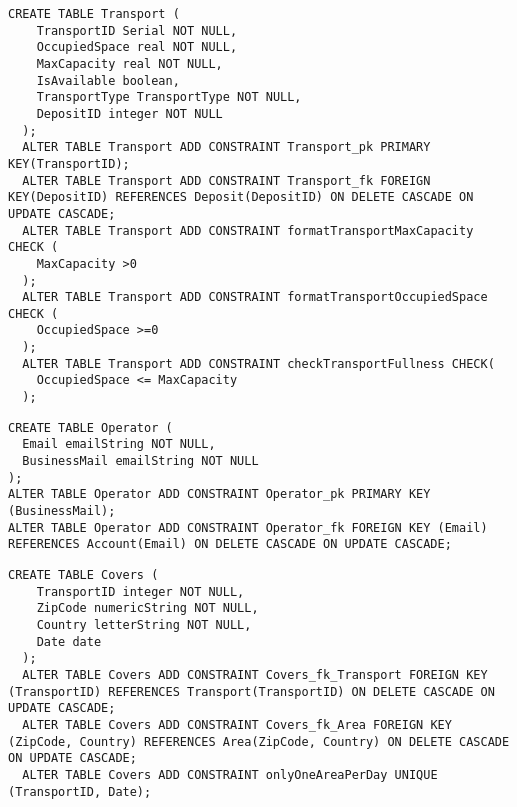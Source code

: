 \newpage
\begin{lstlisting}[caption={Creazione della tabella \textbf{Transport}}]
  CREATE TABLE Transport (
    TransportID Serial NOT NULL,
    OccupiedSpace real NOT NULL,
    MaxCapacity real NOT NULL,
    IsAvailable boolean, 
    TransportType TransportType NOT NULL,
    DepositID integer NOT NULL
  );
  ALTER TABLE Transport ADD CONSTRAINT Transport_pk PRIMARY KEY(TransportID);
  ALTER TABLE Transport ADD CONSTRAINT Transport_fk FOREIGN KEY(DepositID) REFERENCES Deposit(DepositID) ON DELETE CASCADE ON UPDATE CASCADE; 
  ALTER TABLE Transport ADD CONSTRAINT formatTransportMaxCapacity CHECK (
    MaxCapacity >0
  );
  ALTER TABLE Transport ADD CONSTRAINT formatTransportOccupiedSpace CHECK (
    OccupiedSpace >=0
  );
  ALTER TABLE Transport ADD CONSTRAINT checkTransportFullness CHECK(
    OccupiedSpace <= MaxCapacity
  );
\end{lstlisting}

\begin{lstlisting}[caption={Creazione della tabella \textbf{Operator}}]
  CREATE TABLE Operator (
  Email emailString NOT NULL,
  BusinessMail emailString NOT NULL
);
ALTER TABLE Operator ADD CONSTRAINT Operator_pk PRIMARY KEY (BusinessMail);
ALTER TABLE Operator ADD CONSTRAINT Operator_fk FOREIGN KEY (Email) REFERENCES Account(Email) ON DELETE CASCADE ON UPDATE CASCADE;
\end{lstlisting}

\begin{lstlisting}[caption={Creazione della tabella \textbf{Covers}}]
  CREATE TABLE Covers (
    TransportID integer NOT NULL,
    ZipCode numericString NOT NULL,
    Country letterString NOT NULL,
    Date date
  );
  ALTER TABLE Covers ADD CONSTRAINT Covers_fk_Transport FOREIGN KEY (TransportID) REFERENCES Transport(TransportID) ON DELETE CASCADE ON UPDATE CASCADE;
  ALTER TABLE Covers ADD CONSTRAINT Covers_fk_Area FOREIGN KEY (ZipCode, Country) REFERENCES Area(ZipCode, Country) ON DELETE CASCADE ON UPDATE CASCADE;
  ALTER TABLE Covers ADD CONSTRAINT onlyOneAreaPerDay UNIQUE (TransportID, Date);
\end{lstlisting}

